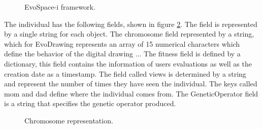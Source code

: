 \begin{figure}
\captionsetup{justification=centering,margin=2cm}
\centering
\setlength\fboxsep{0pt}
\setlength\fboxrule{0.7pt}
\caption{EvoSpace-i framework.}
\label{fig:ESFramework}
\end{figure}


The individual has the following fields, shown in figure \ref{fig:individual_dic}.
The field is represented by a single string for each object. The chromosome
field represented by a string, which for EvoDrawing represents an array of 15
numerical characters which define the behavior of the digital drawing ... The
fitness field is defined by a dictionary, this field contains the information of
users evaluations as well as the creation date as a timestamp. The field called
views is determined by a string and represent the number of times they have seen
the individual. The keys called mom and dad define where the individual comes
from. The GeneticOperator field is a string that specifies the genetic operator
produced.

\begin{figure}
\captionsetup{justification=centering,margin=2cm}
\centering
\setlength\fboxsep{0pt}
\setlength\fboxrule{0.7pt}
\caption{Chromosome representation.}
\label{fig:individual_dic}
\end{figure}

